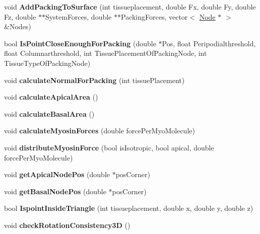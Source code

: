 \begin{DoxyCompactItemize}
\item 
\hypertarget{classPrism_a37ba7c6f45d6b5abbfb0923c0cc72fa9}{}void {\bfseries Add\+Packing\+To\+Surface} (int tissueplacement, double Fx, double Fy, double Fz, double $\ast$$\ast$System\+Forces, double $\ast$$\ast$Packing\+Forces, vector$<$ \hyperlink{classNode}{Node} $\ast$ $>$ \&Nodes)\label{classPrism_a37ba7c6f45d6b5abbfb0923c0cc72fa9}

\item 
\hypertarget{classPrism_a523002e7e6487db1a4506b2f0b2b4e04}{}bool {\bfseries Is\+Point\+Close\+Enough\+For\+Packing} (double $\ast$Pos, float Peripodialthreshold, float Columnarthreshold, int Tissue\+Placement\+Of\+Packing\+Node, int Tissue\+Type\+Of\+Packing\+Node)\label{classPrism_a523002e7e6487db1a4506b2f0b2b4e04}

\item 
\hypertarget{classPrism_adaa9ffb371d07e063e1b280d959a9fe6}{}void {\bfseries calculate\+Normal\+For\+Packing} (int tissue\+Placement)\label{classPrism_adaa9ffb371d07e063e1b280d959a9fe6}

\item 
\hypertarget{classPrism_a67e80515fb1cdf4438b4b7d47334bd2e}{}void {\bfseries calculate\+Apical\+Area} ()\label{classPrism_a67e80515fb1cdf4438b4b7d47334bd2e}

\item 
\hypertarget{classPrism_aa8dd4b90cdaecdbabfb48f45a9bcdc95}{}void {\bfseries calculate\+Basal\+Area} ()\label{classPrism_aa8dd4b90cdaecdbabfb48f45a9bcdc95}

\item 
\hypertarget{classPrism_a306261925defdb79ba64fc5f9ef8a23d}{}void {\bfseries calculate\+Myosin\+Forces} (double force\+Per\+Myo\+Molecule)\label{classPrism_a306261925defdb79ba64fc5f9ef8a23d}

\item 
\hypertarget{classPrism_ab11b5901fc7d65f71c7cccd1ce94a273}{}void {\bfseries distribute\+Myosin\+Force} (bool is\+Isotropic, bool apical, double force\+Per\+Myo\+Molecule)\label{classPrism_ab11b5901fc7d65f71c7cccd1ce94a273}

\item 
\hypertarget{classPrism_a243934a73a8f198ed592761ecb0927b9}{}void {\bfseries get\+Apical\+Node\+Pos} (double $\ast$pos\+Corner)\label{classPrism_a243934a73a8f198ed592761ecb0927b9}

\item 
\hypertarget{classPrism_a31324d23b37fa20911916ebb7ee1064d}{}void {\bfseries get\+Basal\+Node\+Pos} (double $\ast$pos\+Corner)\label{classPrism_a31324d23b37fa20911916ebb7ee1064d}

\item 
\hypertarget{classPrism_a26bb1eed04307a373ba87b48f1c1a3ca}{}bool {\bfseries Ispoint\+Inside\+Triangle} (int tissueplacement, double x, double y, double z)\label{classPrism_a26bb1eed04307a373ba87b48f1c1a3ca}

\item 
\hypertarget{classPrism_a85f9b472a3310e76ab0c76bd1fb7dd30}{}void {\bfseries check\+Rotation\+Consistency3\+D} ()\label{classPrism_a85f9b472a3310e76ab0c76bd1fb7dd30}

\end{DoxyCompactItemize}
